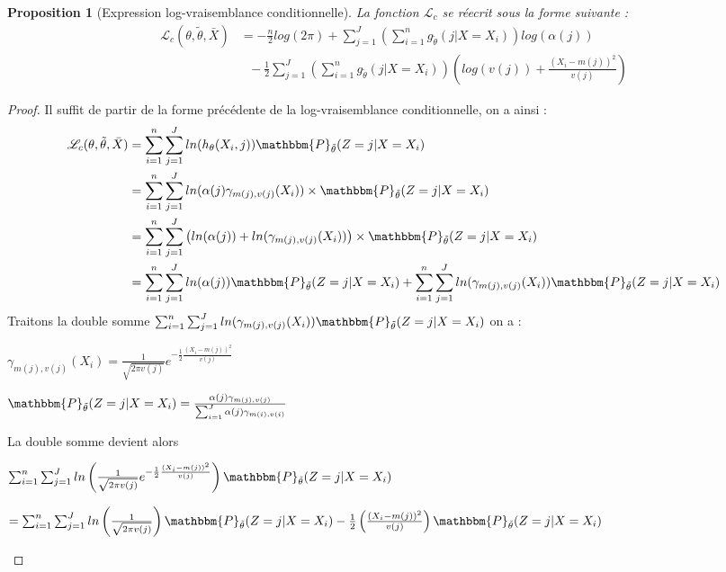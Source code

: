 \documentclass[frenchb]{report}
\newcommand{\1}{\mathbbm{1}}
\newcommand{\prob}{\mathbbm{P}}
\newcommand{\lv}{\mathcal{L}}
\newcommand{\thetat}{\tilde{\theta}}
\newtheorem{prop}{Proposition}
\theoremstyle{definition}\newtheorem{defn}{Définition}
\theoremstyle{definition}\newtheorem{exm}{Exemple}
\theoremstyle{definition}\newtheorem{nota}{Notation}
\theoremstyle{definition}\newtheorem{rem}{Remarque}
\begin{document}
\begin{prop}[Expression log-vraisemblance conditionnelle] La fonction $\lv_{c}$ se réecrit sous la forme suivante : 
\begin{align*}
 \lv_{c}(\theta, \thetat, \bar{X}) &= -\frac{n}{2}log(2\pi)+\sum_{j=1}^J \left(\sum_{i = 1}^n g_{\thetat} (j|X=X_i)\right) log(\alpha(j))\\
&~~~-\frac{1}{2}\sum_{j=1}^J\left(\sum_{i=1}^n g_{\thetat}(j|X=X_i)\right)\left(log(v(j))+\frac{(X_i-m(j))^2}{v(j)}\right)
\end{align*}
\end{prop}

\begin{proof}
Il suffit de partir de la forme précédente de la log-vraisemblance conditionnelle, on a ainsi : 
\begin{align*}
 \lv_{c}(\theta, \thetat, \bar{X}) &= \sum_{i=1}^n \sum_{j = 1}^J ln(h_\theta(X_i,j)) \prob_{\thetat} (Z = j|X = X_i)\\
&= \sum_{i=1}^n \sum_{j = 1}^J ln(\alpha(j)\gamma_{m(j),v(j)}(X_i))\times \prob_{\thetat} (Z = j|X = X_i)\\
&= \sum_{i=1}^n \sum_{j = 1}^J \left(ln(\alpha(j))+ln(\gamma_{m(j),v(j)}(X_i))\right)\times \prob_{\thetat} (Z = j|X = X_i)\\
&= \sum_{i=1}^n \sum_{j = 1}^J ln(\alpha(j))\prob_{\thetat} (Z = j|X = X_i)+\sum_{i=1}^n \sum_{j = 1}^J ln(\gamma_{m(j),v(j)}(X_i))\prob_{\thetat} (Z = j|X = X_i)\\
\end{align*}
Traitons la double somme 
$\sum_{i=1}^n \sum_{j = 1}^J ln(\gamma_{m(j),v(j)}(X_i))\prob_{\thetat} (Z = j|X = X_i)$
on a :
\begin{center}
$\gamma_{m(j),v(j)}(X_i) = \frac{1}{\sqrt{2 \pi v(j)}}e^{-\frac{1}{2}\frac{(X_i - m(j))^2}{v(j)}}$
\end{center}
\begin{center}
$\prob_{\thetat} (Z = j|X = X_i) = \frac{\alpha(j)\gamma_{m(j),v(j)}}{\sum_{i=1}^J \alpha(j)\gamma_{m(i),v(i)}}$
\end{center}
La double somme devient alors 
\begin{center}
$\sum_{i=1}^n \sum_{j = 1}^J ln\left(\frac{1}{\sqrt{2 \pi v(j)}}e^{-\frac{1}{2}\frac{(X_i - m(j))^2}{v(j)}}\right)\prob_{\thetat} (Z = j|X = X_i)$
\end{center}
\begin{center}
$=\sum_{i=1}^n \sum_{j = 1}^J ln\left(\frac{1}{\sqrt{2 \pi v(j)}}\right)\prob_{\thetat} (Z = j|X = X_i) -\frac{1}{2}\left(\frac{(X_i - m(j))^2}{v(j)}\right)\prob_{\thetat} (Z = j|X = X_i) $

\end{center}
\end{proof}
\end{document}

